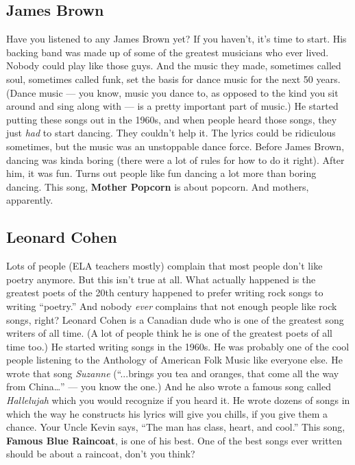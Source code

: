 \documentclass[letterpaper,]{article}
\begin{document}
\hypertarget{james-brown}{%
\subsection{James Brown}\label{james-brown}}

Have you listened to any James Brown yet? If you haven't, it's time to
start. His backing band was made up of some of the greatest musicians
who ever lived. Nobody could play like those guys. And the music they
made, sometimes called soul, sometimes called funk, set the basis for
dance music for the next 50 years. (Dance music --- you know, music you
dance to, as opposed to the kind you sit around and sing along with ---
is a pretty important part of music.) He started putting these songs out
in the 1960s, and when people heard those songs, they just \emph{had} to
start dancing. They couldn't help it. The lyrics could be ridiculous
sometimes, but the music was an unstoppable dance force. Before James
Brown, dancing was kinda boring (there were a lot of rules for how to do
it right). After him, it was fun. Turns out people like fun dancing a
lot more than boring dancing. This song, \textbf{Mother Popcorn} is
about popcorn. And mothers, apparently.

\hypertarget{leonard-cohen}{%
\subsection{Leonard Cohen}\label{leonard-cohen}}

Lots of people (ELA teachers mostly) complain that most people don't
like poetry anymore. But this isn't true at all. What actually happened
is the greatest poets of the 20th century happened to prefer writing
rock songs to writing ``poetry.'' And nobody \emph{ever} complains that
not enough people like rock songs, right? Leonard Cohen is a Canadian
dude who is one of the greatest song writers of all time. (A lot of
people think he is one of the greatest poets of all time too.) He
started writing songs in the 1960s. He was probably one of the cool
people listening to the Anthology of American Folk Music like everyone
else. He wrote that song \emph{Suzanne} (``...brings you tea and
oranges, that come all the way from China\ldots{}'' --- you know the
one.) And he also wrote a famous song called \emph{Hallelujah} which you
would recognize if you heard it. He wrote dozens of songs in which the
way he constructs his lyrics will give you chills, if you give them a
chance. Your Uncle Kevin says, ``The man has class, heart, and cool.''
This song, \textbf{Famous Blue Raincoat}, is one of his best. One of the
best songs ever written should be about a raincoat, don't you think?
\end{document}
